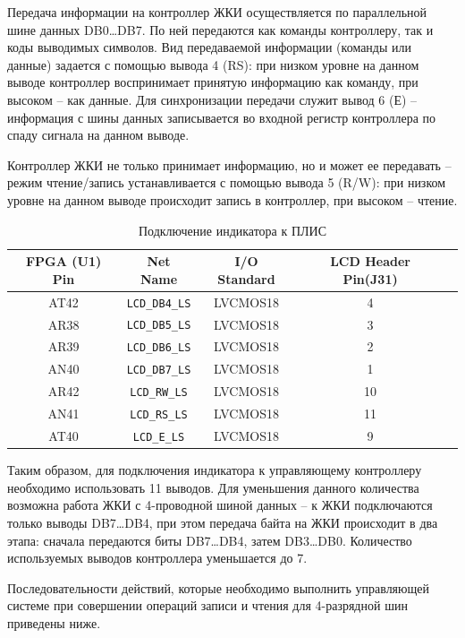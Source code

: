 \documentclass[a4paper,oneside ,10pt]{extreport}
\begin{document}
Передача информации на контроллер ЖКИ осуществляется по 
параллельной шине данных DB0…DB7. 
По ней передаются как команды контроллеру, так и коды выводимых символов. 
Вид передаваемой информации (команды или данные) задается 
с помощью вывода 4 (RS): при низком уровне на данном выводе 
контроллер воспринимает принятую информацию как команду, при высоком – как данные. 
Для синхронизации передачи служит вывод 6 (Е) – 
информация с шины данных записывается во входной регистр контроллера 
по спаду сигнала на данном выводе.

Контроллер ЖКИ не только принимает информацию, но и может 
ее передавать – режим чтение/запись устанавливается с помощью 
вывода 5 (R/W): при низком уровне на данном выводе происходит 
запись в контроллер, при высоком – чтение.

\begin{table}[!ht]
	\begin{center}
		\begin{tabular}{c c c c c}
			\hline\hline
			FPGA (U1) Pin & Net Name &  I/O Standard & LCD Header Pin(J31) \\
			\hline
			AT42 & \verb|LCD_DB4_LS| & LVCMOS18 & 4 \\
			AR38 & \verb|LCD_DB5_LS| & LVCMOS18 & 3 \\
			AR39 & \verb|LCD_DB6_LS| & LVCMOS18 & 2 \\
			AN40 & \verb|LCD_DB7_LS| & LVCMOS18 & 1 \\
			AR42 & \verb|LCD_RW_LS| & LVCMOS18 & 10 \\
			AN41 & \verb|LCD_RS_LS| & LVCMOS18 & 11 \\
			AT40 & \verb|LCD_E_LS| & LVCMOS18 & 9 \\
			\hline
		\end{tabular}
		\caption{Подключение индикатора к ПЛИС}
		\label{LCD_TO_FPGA}
	\end{center}
\end{table}

Таким образом, для подключения индикатора к управляющему 
контроллеру необходимо использовать 11 выводов. Для уменьшения 
данного количества возможна работа ЖКИ с 4-проводной шиной 
данных – к ЖКИ подключаются только выводы DB7…DB4, при 
этом передача байта на ЖКИ происходит в два этапа: сначала передаются биты DB7…DB4, затем DB3…DB0. Количество используемых выводов контроллера уменьшается до 7.

Последовательности действий, которые необходимо выполнить 
управляющей системе при совершении операций записи и чтения 
для 4-разрядной шин приведены ниже.
\end{document}
